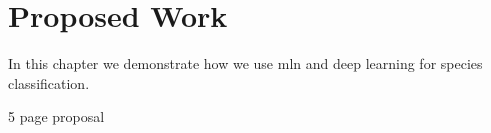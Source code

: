 \chapter{Proposed Work}
\label{chapter:Proposed Work}

In this chapter we demonstrate how we use mln and deep learning for species classification.

5 page proposal